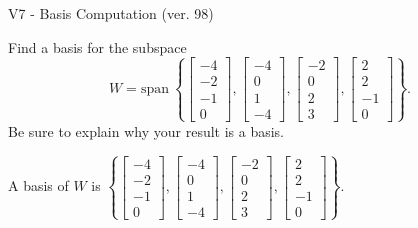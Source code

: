 \begin{exercise}
  \begin{exerciseTitle}V7 - Basis Computation (ver. 98)\end{exerciseTitle}
  \begin{exerciseStatement}
    Find a basis for the subspace 
\[W=\mathrm{span}\ \left\{\left[\begin{array}{r}
-4 \\
-2 \\
-1 \\
0
\end{array}\right] , \left[\begin{array}{r}
-4 \\
0 \\
1 \\
-4
\end{array}\right] , \left[\begin{array}{r}
-2 \\
0 \\
2 \\
3
\end{array}\right] , \left[\begin{array}{r}
2 \\
2 \\
-1 \\
0
\end{array}\right]\right\}.\]
 Be sure to explain why your result is a basis.


  \end{exerciseStatement}
  \begin{exerciseAnswer}
   A basis of \(W\) is  \(\left\{\left[\begin{array}{r}
-4 \\
-2 \\
-1 \\
0
\end{array}\right] , \left[\begin{array}{r}
-4 \\
0 \\
1 \\
-4
\end{array}\right] , \left[\begin{array}{r}
-2 \\
0 \\
2 \\
3
\end{array}\right] , \left[\begin{array}{r}
2 \\
2 \\
-1 \\
0
\end{array}\right]\right\}\).
  


  \end{exerciseAnswer}
\end{exercise}